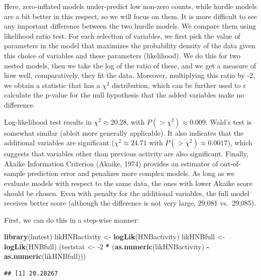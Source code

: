 \documentclass[10pt,]{scrartcl}
\newenvironment{Shaded}{\begin{snugshade}}{\end{snugshade}}
\newcommand{\KeywordTok}[1]{\textcolor[rgb]{0.13,0.29,0.53}{\textbf{#1}}}
\newcommand{\DecValTok}[1]{\textcolor[rgb]{0.00,0.00,0.81}{#1}}
\newcommand{\StringTok}[1]{\textcolor[rgb]{0.31,0.60,0.02}{#1}}
\newcommand{\OperatorTok}[1]{\textcolor[rgb]{0.81,0.36,0.00}{\textbf{#1}}}
\newcommand{\NormalTok}[1]{#1}
\begin{document}
Here, zero-inflated models under-predict low non-zero counts, while
hurdle models are a bit better in this respect, so we will focus on
them. It is more difficult to see any important difference between the
two hurdle models. We compare them using likelihood ratio test. For each
selection of variables, we first pick the value of parameters in the
model that maximizes the probability density of the data given this
choice of variables and these parameters (likelihood). We do this for
two nested models, then we take the log of the ratio of these, and we
get a measure of how well, comparatively, they fit the data. Moreover,
multiplying this ratio by -2, we obtain a statistic that has a
\(\chi^2\) distribution, which can be further used to r calculate the
p-value for the null hypothesis that the added variables make no
difference.

Log-likelihood test results in \(\chi^2 \approx 20.28\), with
\(P(>\chi^2)\approx 0.009\). Wald's test is somewhat similar (ableit
more generally applicable). It also indicates that the additional
variables are significant (\(\chi^2 \approx 24.71\) with
\(P(>\chi^2)\approx 0.0017\)), which suggests that variables other than
previous activity are also significant. Finally, Akaike Information
Criterion (Akaike, 1974) provides an estimator of out-of-sample
prediction error and penalizes more complex models. As long as we
evaluate models with respect to the same data, the ones with lower
Akaike score should be chosen. Even with penalty for the additional
variables, the full model receives better score (although the difference
is not very large, 29,081 vs.~29,085).

First, we can do this in a step-wise manner:

\footnotesize

\begin{Shaded}
\begin{Highlighting}[]
\KeywordTok{library}\NormalTok{(lmtest)}
\NormalTok{likHNBactivity <-}\StringTok{ }\KeywordTok{logLik}\NormalTok{(HNBactivity)}
\NormalTok{likHNBfull <-}\StringTok{ }\KeywordTok{logLik}\NormalTok{(HNBfull)}
\NormalTok{(teststat <-}\StringTok{ }\DecValTok{-2} \OperatorTok{*}\StringTok{ }\NormalTok{(}\KeywordTok{as.numeric}\NormalTok{(likHNBactivity) }\OperatorTok{-}\StringTok{ }\KeywordTok{as.numeric}\NormalTok{(likHNBfull)))}
\end{Highlighting}
\end{Shaded}

\begin{verbatim}
## [1] 20.28267
\end{verbatim}
\end{document}
